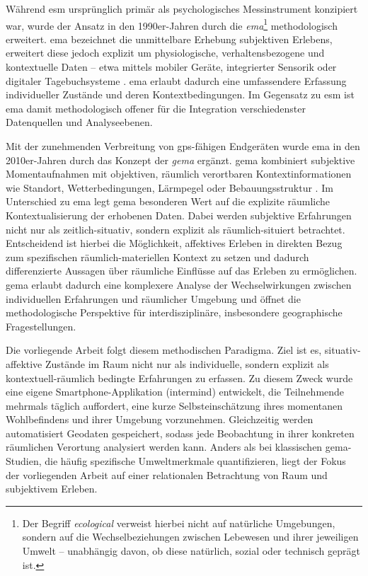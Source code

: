 Während \acrshort{esm} ursprünglich primär als psychologisches Messinstrument konzipiert war, wurde der Ansatz in den 1990er-Jahren durch die \emph{\acrfull{ema}}\footnote{Der Begriff \textit{ecological} verweist hierbei nicht auf natürliche Umgebungen, sondern auf die Wechselbeziehungen zwischen Lebewesen und ihrer jeweiligen Umwelt -- unabhängig davon, ob diese natürlich, sozial oder technisch geprägt ist.} methodologisch erweitert. \acrshort{ema} bezeichnet die unmittelbare Erhebung subjektiven Erlebens, erweitert diese jedoch explizit um physiologische, verhaltensbezogene und kontextuelle Daten -- etwa mittels mobiler Geräte, integrierter Sensorik oder digitaler Tagebuchsysteme \parencite{shiffmanEcologicalMomentaryAssessment2008}. \acrshort{ema} erlaubt dadurch eine umfassendere Erfassung individueller Zustände und deren Kontextbedingungen. Im Gegensatz zu \acrshort{esm} ist \acrshort{ema} damit methodologisch offener für die Integration verschiedenster Datenquellen und Analyseebenen.

Mit der zunehmenden Verbreitung von \gls{gps}-fähigen Endgeräten wurde \acrshort{ema} in den 2010er-Jahren durch das Konzept der \emph{\acrfull{gema}} ergänzt. \acrshort{gema} kombiniert subjektive Momentaufnahmen mit objektiven, räumlich verortbaren Kontextinformationen wie Standort, Wetterbedingungen, Lärmpegel oder Bebauungsstruktur \parencite{kirchnerSpatiotemporalDeterminantsMental2016}. Im Unterschied zu \acrshort{ema} legt \acrshort{gema} besonderen Wert auf die explizite räumliche Kontextualisierung der erhobenen Daten. Dabei werden subjektive Erfahrungen nicht nur als zeitlich-situativ, sondern explizit als räumlich-situiert betrachtet. Entscheidend ist hierbei die Möglichkeit, affektives Erleben in direkten Bezug zum spezifischen räumlich-materiellen Kontext zu setzen und dadurch differenzierte Aussagen über räumliche Einflüsse auf das Erleben zu ermöglichen. \acrshort{gema} erlaubt dadurch eine komplexere Analyse der Wechselwirkungen zwischen individuellen Erfahrungen und räumlicher Umgebung und öffnet die methodologische Perspektive für interdisziplinäre, insbesondere geographische Fragestellungen.

Die vorliegende Arbeit folgt diesem methodischen Paradigma. Ziel ist es, situativ-affektive Zustände im Raum nicht nur als individuelle, sondern explizit als kontextuell-räumlich bedingte Erfahrungen zu erfassen. Zu diesem Zweck wurde eine eigene Smartphone-Applikation (\gls{intermind}) entwickelt, die Teilnehmende mehrmals täglich auffordert, eine kurze Selbsteinschätzung ihres momentanen Wohlbefindens und ihrer Umgebung vorzunehmen. Gleichzeitig werden automatisiert Geodaten gespeichert, sodass jede Beobachtung in ihrer konkreten räumlichen Verortung analysiert werden kann. Anders als bei klassischen \acrshort{gema}-Studien, die häufig spezifische Umweltmerkmale quantifizieren, liegt der Fokus der vorliegenden Arbeit auf einer relationalen Betrachtung von Raum und subjektivem Erleben.

